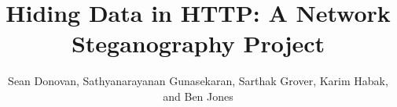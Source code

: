 \documentclass{acmsmall}
\begin{document}

\title{Hiding Data in HTTP: A Network Steganography Project}
\author{Sean Donovan, Sathyanarayanan Gunasekaran, Sarthak Grover, Karim Habak, and Ben Jones}
\maketitle








\nocite{Ref1,Ref2,Ref3,Ref4,Ref5,Ref6,Ref7,Ref8,Ref9,Ref10,Ref12,Ref13,Ref14,Ref15 }



\end{document}
